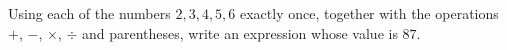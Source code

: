 Using each of the numbers $2,3,4,5,6$ exactly once, together with the operations $+$, $-$, $\times$, $\div$ and parentheses, write an expression whose value is $87$.
